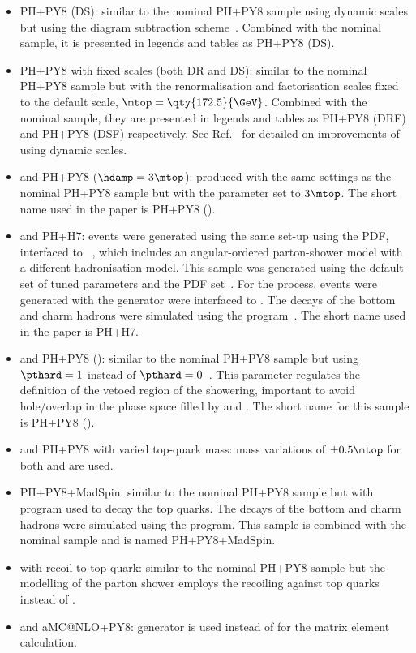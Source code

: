 \begin{itemize}
	\item \tW PH+PY8 (DS): similar to the nominal PH+PY8 sample using dynamic scales but using
    the diagram subtraction scheme~\cite{Frixione:2008yi,ATL-PHYS-PUB-2016-020}.
    Combined with the nominal \ttbar sample, it is presented in legends and tables as PH+PY8 (DS).
	\item \tW PH+PY8 with fixed scales (both DR and DS):
    similar to the nominal PH+PY8 sample but with the renormalisation and
    factorisation scales fixed to the default scale, \(\mtop = \qty{172.5}{\GeV}\).
    Combined with the nominal \ttbar sample, they are presented in legends
    and tables as PH+PY8 (DRF) and PH+PY8 (DSF) respectively. See Ref.~\cite{ATL-PHYS-PUB-2021-042} for detailed on improvements of using dynamic scales.
	\item \ttbar and \tW PH+PY8 (\(\hdamp = 3 \mtop \)):
    produced with the same settings as the nominal PH+PY8 sample but with the 
	\hdamp parameter set to \( 3 \mtop \). The short name used in the paper is PH+PY8 (\hdamp).
	\item \ttbar and \tW PH+H7: events were generated using the same \POWHEGBOX[v2] set-up
    using the \NNPDF[3.0nlo] PDF, interfaced to \HERWIG[7.1.3]~\cite{Bellm:2015jjp,Bahr:2008pv},
    which includes an angular-ordered parton-shower model with a different hadronisation model. This sample was generated using the \HERWIG[7.1]
    default set of tuned parameters and the \MMHT[lo] PDF set~\cite{Harland-Lang:2014zoa}.
    For the \tW process, events were generated with the \POWHEGBOX[v2] generator were
    interfaced to \HERWIG[7.2].
    The decays of the bottom and charm hadrons were simulated using the \EVTGEN[1.6.0]
    program~\cite{Lange:2001uf}. The short name used in the paper is PH+H7.
	\item \ttbar and \tW PH+PY8 (\pthard): similar to the nominal PH+PY8 sample
    but using \( \pthard = 1 \) instead of  \( \pthard = 0 \)~\cite{10.21468/SciPostPhys.12.1.010}.
    This parameter regulates the definition of the vetoed region of the showering,
    important to avoid hole/overlap in the phase space filled by \POWHEG and \PYTHIA.
    The short name for this sample is PH+PY8 (\pthard).
	\item \ttbar and \tW PH+PY8 with varied top-quark mass:
    mass variations of \( \pm 0.5 \mtop \) for both \ttbar and \tW are used.
	\item \ttbar PH+PY8+MadSpin: similar to the nominal PH+PY8 sample but with
    \madspin~\cite{Artoisenet:2012st} program used to decay the top quarks.
    The decays of the bottom and charm hadrons were simulated using the \EVTGEN[1.7.0]
    program. This sample is combined with the nominal \tW sample and is named PH+PY8+MadSpin.
    \item \ttbar with recoil to top-quark: similar to the nominal PH+PY8 sample
    but the modelling of the parton shower employs the recoiling against top quarks instead of \bquarks.
    \item \ttbar and \tW aMC@NLO+PY8: \MGNLO generator is used instead of \PYTHIA for the matrix element calculation.
\end{itemize}

